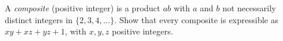 A \emph{composite} (positive integer) is a product $ab$ with $a$ and
$b$ not necessarily distinct integers in $\{2,3,4,\dots\}$. Show that
every composite is expressible as $xy+xz+yz+1$, with $x,y,z$ positive
integers.
